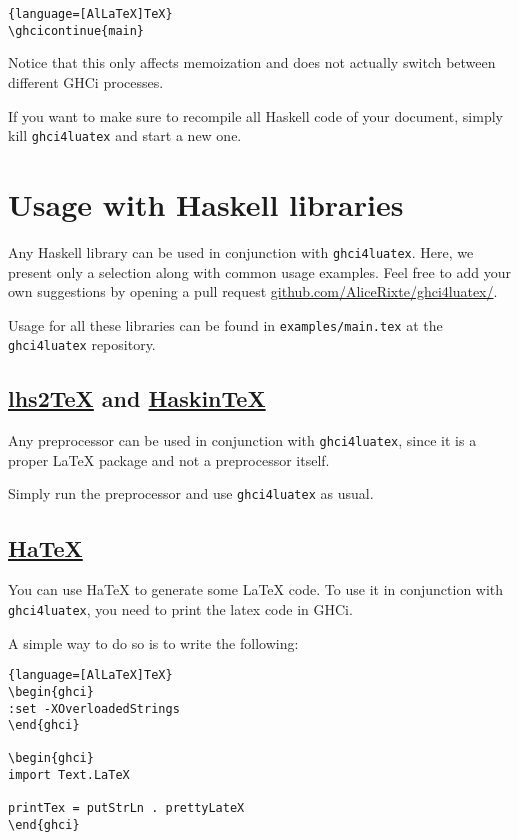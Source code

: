 \documentclass{article}
\begin{document}
\begin{lstlisting}{language=[AlLaTeX]TeX}
\ghcicontinue{main}
\end{lstlisting}

Notice that this only affects memoization and does not actually switch between different GHCi processes.

\begin{tipbox}
  If you want to make sure to recompile all Haskell code of your document, simply kill \texttt{ghci4luatex} and start a new one.
\end{tipbox}


\section{Usage with Haskell libraries}

Any Haskell library can be used in conjunction with \texttt{ghci4luatex}. Here, we present only a selection along with common usage examples. Feel free to add your own suggestions by opening a pull request \href{https://github.com/AliceRixte/ghci4luatex/}{github.com/AliceRixte/ghci4luatex/}.


Usage for all these libraries can be found in \texttt{examples/main.tex} at the \texttt{ghci4luatex} repository.

\subsection{\href{https://hackage.haskell.org/package/lhs2tex}{lhs2TeX} and \href{https://daniel-diaz.github.io/projects/haskintex/}{HaskinTeX}}

Any preprocessor can be used in conjunction with \texttt{ghci4luatex}, since it is a proper LaTeX package and not a preprocessor itself.

Simply run the preprocessor and use \texttt{ghci4luatex} as usual.

\subsection{\href{https://hackage.haskell.org/package/HaTeX}{HaTeX}}

You can use HaTeX to generate some LaTeX code. To use it in conjunction with \texttt{ghci4luatex}, you need to print the latex code in GHCi.

A simple way to do so is to write the following:

\begin{latexbox}
  \begin{lstlisting}{language=[AlLaTeX]TeX}
\begin{ghci}
:set -XOverloadedStrings
\end{ghci}

\begin{ghci}
import Text.LaTeX

printTex = putStrLn . prettyLateX
\end{ghci}
\end{lstlisting}
\end{latexbox}
\end{document}
